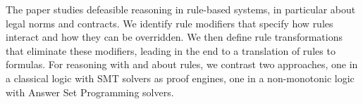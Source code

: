 The paper studies defeasible reasoning in rule-based systems, in particular
about legal norms and contracts. We identify rule modifiers that specify how
rules interact and how they can be overridden. We then define rule
transformations that eliminate these modifiers, leading in the end to 
a translation of rules to formulas. For reasoning with and about rules, we
contrast two approaches, one in a classical logic with SMT solvers as proof
engines, one in a non-monotonic logic with Answer Set Programming solvers.

